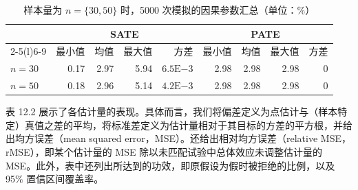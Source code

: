 \begin{table}[htbp]
\centering
\caption{样本量为 $n=\{30,50\}$ 时，5000 次模拟的因果参数汇总（单位：\%）}
\label{tab:ch12-parameters}
\begingroup
\small
\setlength{\tabcolsep}{4pt}
\begin{tabular}{@{}lrrrrrrrr@{}}
\toprule
& \multicolumn{4}{c}{SATE} & \multicolumn{4}{c}{PATE} \\
\cmidrule(lr){2-5}\cmidrule(l){6-9}
& 最小值 & 均值 & 最大值 & 方差 & 最小值 & 均值 & 最大值 & 方差 \\
\midrule
$n=30$ & 0.17 & 2.97 & 5.94 & $6.5\mathrm E{-3}$ & 2.98 & 2.98 & 2.98 & 0 \\
$n=50$ & 0.18 & 2.96 & 5.14 & $4.2\mathrm E{-3}$ & 2.98 & 2.98 & 2.98 & 0 \\
\bottomrule
\end{tabular}
\endgroup
\end{table}

表 12.2 展示了各估计量的表现。具体而言，我们将偏差定义为点估计与（样本特定）真值之差的平均，将标准差定义为估计量相对于其目标的方差的平方根，并给出均方误差（mean squared error，MSE）。还给出相对均方误差（relative MSE，rMSE），即某个估计量的 MSE 除以未匹配试验中总体效应未调整估计量的 MSE。此外，表中还列出所达到的功效，即原假设为假时被拒绝的比例，以及 95\% 置信区间覆盖率。

